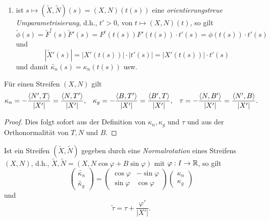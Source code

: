 \begin{lemma, definition}
\begin{remark}
\begin{enumerate}
		\item ist $s \mapsto (\widetilde{X}, \widetilde{N})(s) = (X,N)(t(s))$ eine \emph{orientierungstreue Umparametrisierung}, d.h., $t' >0$, von $t \mapsto (X,N)(t)$, so gilt
		\[\widetilde{\phi}(s) = \widetilde{F}^t(s)\widetilde{F}'(s) = F^t(t(s))F'(t(s))\cdot t'(s) =\phi(t(s)) \cdot t'(s) \] und \[ |\widetilde{X}'(s)| = |X'(t(s))|\cdot|t'(s)| =  |X'(t(s))|\cdot t'(s) \] und damit $\widetilde{\kappa_n}(s)= \kappa_n(t(s))$ usw.
	\end{enumerate}
\end{remark}

\begin{lemma}
	Für einen Streifen $(X,N)$ gilt
	\begin{align*}
		\kappa_n 	= -\frac {\left \langle N',T \right\rangle}{\left| X'\right|} = \frac {\left \langle N,T' \right\rangle}{\left| X'\right|}, &&
		\kappa_g 	= -\frac {\left \langle B,T' \right\rangle}{\left| X'\right|} = \frac {\left \langle B',T \right\rangle}{\left| X'\right|}, &&
		\tau  		= -\frac {\left \langle N,B' \right\rangle}{\left| X'\right|} = \frac {\left \langle N',B \right\rangle}{\left| X'\right|} .
	\end{align*}
\end{lemma}
\begin{proof}
	Dies folgt sofort aus der Definition von $\kappa_n,\kappa_g$ und $\tau$ und aus der Orthonormalität von $T,N$ und $B$.
\end{proof}

\begin{remark, definition}
	Ist ein Streifen $(\widetilde{X},\widetilde{N})$ gegeben durch eine \emph{Normalrotation} eines Streifens $(X,N)$, d.h., $\widetilde{X}, \widetilde{N} = (X,N \cos \varphi + B \sin \varphi)$ mit $\varphi: I \rightarrow \mathbb R$, so gilt
	\begin{equation*}
	\begin{pmatrix} 
		\widetilde{\kappa_n}\\
		\widetilde{\kappa_g}
	\end{pmatrix}
	=
	 \begin{pmatrix} 
	 \cos \varphi & - \sin \varphi \\
	 \sin \varphi & \cos \varphi
	 \end{pmatrix}
	 \begin{pmatrix}
	 \kappa_n\\
	 \kappa_g
	 \end{pmatrix}
	\end{equation*} und
	$$\widetilde{\tau} = \tau + \frac{\varphi'}{|X'|}  .$$
	
	
\end{remark, definition}
	
\end{lemma, definition}

